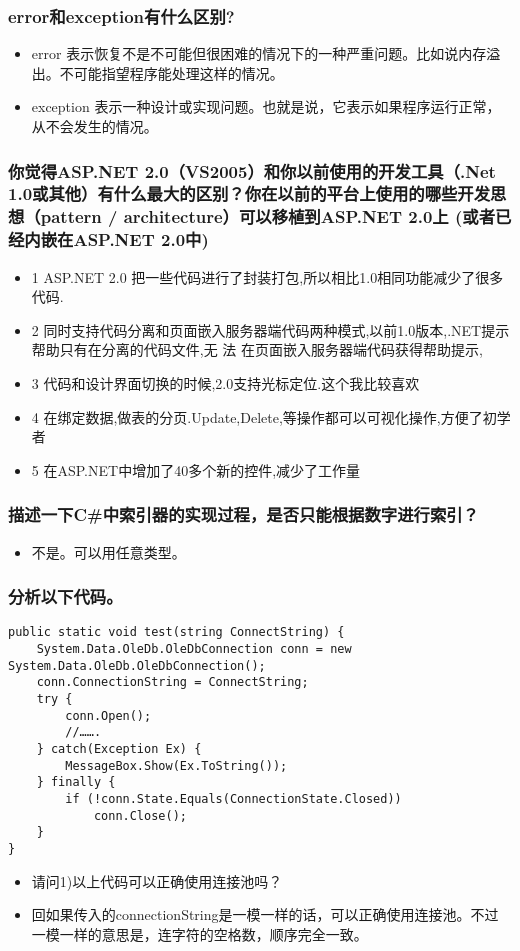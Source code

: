 \documentclass[9pt, b5paper]{article}
\begin{document}
\subsubsection{error和exception有什么区别?}
\label{sec-1-1-115}
\begin{itemize}
\item error 表示恢复不是不可能但很困难的情况下的一种严重问题。比如说内存溢出。不可能指望程序能处理这样的情况。
\item exception 表示一种设计或实现问题。也就是说，它表示如果程序运行正常，从不会发生的情况。
\end{itemize}
\subsubsection{你觉得ASP.NET 2.0（VS2005）和你以前使用的开发工具（.Net 1.0或其他）有什么最大的区别？你在以前的平台上使用的哪些开发思想（pattern / architecture）可以移植到ASP.NET 2.0上 (或者已经内嵌在ASP.NET 2.0中)}
\label{sec-1-1-116}
\begin{itemize}
\item 1 ASP.NET 2.0 把一些代码进行了封装打包,所以相比1.0相同功能减少了很多代码.
\item 2 同时支持代码分离和页面嵌入服务器端代码两种模式,以前1.0版本,.NET提示帮助只有在分离的代码文件,无 法 在页面嵌入服务器端代码获得帮助提示,
\item 3 代码和设计界面切换的时候,2.0支持光标定位.这个我比较喜欢
\item 4 在绑定数据,做表的分页.Update,Delete,等操作都可以可视化操作,方便了初学者
\item 5 在ASP.NET中增加了40多个新的控件,减少了工作量
\end{itemize}
\subsubsection{描述一下C\#中索引器的实现过程，是否只能根据数字进行索引？}
\label{sec-1-1-117}
\begin{itemize}
\item 不是。可以用任意类型。
\end{itemize}
\subsubsection{分析以下代码。}
\label{sec-1-1-118}
\begin{verbatim}
public static void test(string ConnectString) {
    System.Data.OleDb.OleDbConnection conn = new System.Data.OleDb.OleDbConnection();
    conn.ConnectionString = ConnectString;
    try {
        conn.Open();
        //…….
    } catch(Exception Ex) {
        MessageBox.Show(Ex.ToString());
    } finally {
        if (!conn.State.Equals(ConnectionState.Closed))
            conn.Close();
    }
}
\end{verbatim}
\begin{itemize}
\item 请问1)以上代码可以正确使用连接池吗？
\item 回如果传入的connectionString是一模一样的话，可以正确使用连接池。不过一模一样的意思是，连字符的空格数，顺序完全一致。
\end{itemize}
\end{document}
